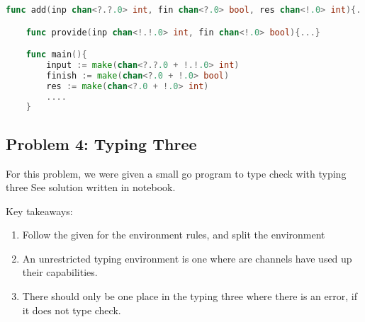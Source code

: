 \begin{lstlisting}[language=go]
    func add(inp chan<?.?.0> int, fin chan<?.0> bool, res chan<!.0> int){...}

    func provide(inp chan<!.!.0> int, fin chan<!.0> bool){...}

    func main(){
        input := make(chan<?.?.0 + !.!.0> int)
        finish := make(chan<?.0 + !.0> bool)
        res := make(chan<?.0 + !.0> int)
        ....
    }
\end{lstlisting}


\subsection{Problem 4: Typing Three}

For this problem, we were given a small go program to type check with typing three
See solution written in notebook.

Key takeaways: 
\begin{enumerate}
    \item Follow the given for the environment rules, and split the environment
    \item An unrestricted typing environment is one where are channels have used up their capabilities. 
    \item There should only be one place in the typing three where there is an error, if it does not type check. 
\end{enumerate}
